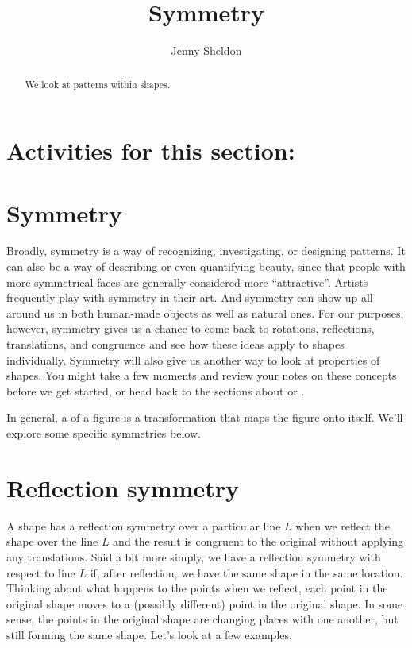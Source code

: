 \documentclass{ximera}
\title{Symmetry}
\author{Jenny Sheldon}
\begin{document}
\begin{abstract}
We look at patterns within shapes.
\end{abstract}
\maketitle

\section{Activities for this section:} 

\section{Symmetry}

Broadly, symmetry is a way of recognizing, investigating, or designing patterns. It can also be a way of describing or even quantifying beauty, since  that people with more symmetrical faces are generally considered more ``attractive''. Artists frequently play with symmetry in their art. And symmetry can show up all around us in both human-made objects as well as natural ones. For our purposes, however, symmetry gives us a chance to come back to rotations, reflections, translations, and congruence and see how these ideas apply to shapes individually. Symmetry will also give us another way to look at properties of shapes. You might take a few moments and review your notes on these concepts before we get started, or head back to the sections about  or .

In general, a  of a figure is a transformation that maps the figure onto itself. We'll explore some specific symmetries below. 

\section{Reflection symmetry}

A shape has a reflection symmetry over a particular line $L$ when we reflect the shape over the line $L$ and the result is congruent to the original without applying any translations. Said a bit more simply, we have a reflection symmetry with respect to line $L$ if, after reflection, we have the same shape in the same location. Thinking about what happens to the points when we reflect, each point in the original shape moves to a (possibly different) point in the original shape. In some sense, the points in the original shape are changing places with one another, but still forming the same shape. Let's look at a few examples.
\end{document}
